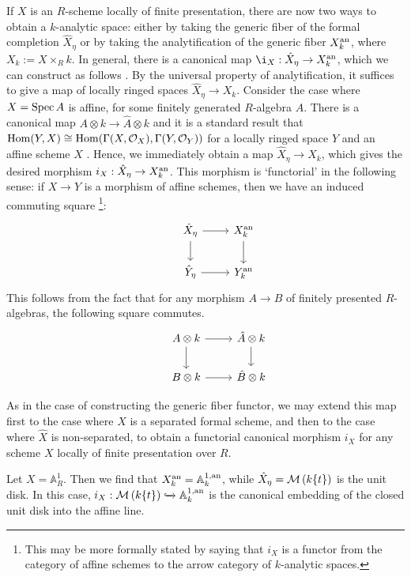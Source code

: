 If $X$ is an $R$-scheme locally of finite presentation, there are now two ways to obtain a $k$-analytic space: either by taking the generic fiber of the formal completion $\hat{X}_{\eta}$ or by taking the analytification of the generic fiber $X_k^{\text{an}}$, where $X_k := X \times_{R} k$.
In general, there is a canonical map $\i_{X}: \hat{X}_{\eta} \to \anl{X_{k}}$, which we can construct as follows \parencite[\S 5.3]{bconrad}.
By the universal property of analytification, it suffices to give a map of locally ringed spaces $\hat{X}_{\eta} \to X_{k}$. Consider the case where $X = \operatorname{Spec} A$ is affine, for some finitely generated $R$-algebra $A$.
There is a canonical map $A \otimes k \to \hat{A} \otimes k$ and it is a standard result that $\operatorname{Hom}(Y, X) \cong \operatorname{Hom}(\Gamma(X, \mathcal{O}_X), \Gamma(Y, \mathcal{O}_Y))$ for a locally ringed space $Y$ and an affine scheme $X$ \parencite[Tag 01I1]{stacks-project}. 
Hence, we immediately obtain a map $\hat{X}_{\eta} \to X_k$, which gives the desired morphism $i_X: \hat{X}_{\eta} \to X_k^{\text{an}}$.
This morphism is `functorial' in the following sense: if $X \to Y$ is a morphism of affine schemes, then we have an induced commuting square \footnote{This may be more formally stated by saying that $i_X$ is a functor from the category of affine schemes to the arrow category of $k$-analytic spaces.}:
\[
\begin{tikzcd}
 & \hat{X}_{\eta} \arrow[r] \arrow[d] & \anl{X_k} \arrow[d] \\
 & \hat{Y}_{\eta} \arrow[r] & \anl{Y_k}
\end{tikzcd}
\]
This follows from the fact that for any morphism $A \to B$ of finitely presented $R$-algebras, the following square commutes.
\[
\begin{tikzcd}
 & A \otimes k \arrow[r] \arrow[d] & \hat{A} \otimes k \arrow[d] \\
 & B \otimes k \arrow[r] & \hat{B} \otimes k
\end{tikzcd}
\]



As in the case of constructing the generic fiber functor, we may extend this map first to the case where $\hat{X}$ is a separated formal scheme, and then to the case where $\hat{X}$ is non-separated, to obtain a functorial canonical morphism $i_X$ for any scheme $X$ locally of finite presentation over $R$.

\begin{example}
    Let $X = \mathbb{A}^{1}_{R}$. Then we find that $X_k^{\text{an}} = \mathbb{A}^{1, \text{an}}_{k}$, while $\hat{X}_{\eta} = \mathcal{M}\left(k\{t\}\right)$ is the unit disk. 
    In this case, $i_X : \mathcal{M}\left(k\{t\}\right) \xhookrightarrow{} \mathbb{A}^{1, \text{an}}_{k}$ is the canonical embedding of the closed unit disk into the affine line.
\end{example}

